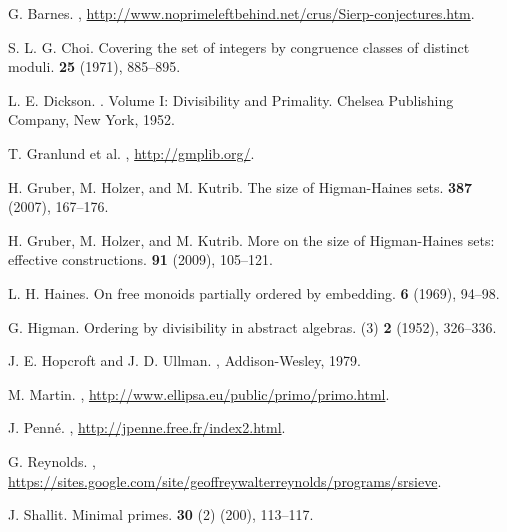\documentclass[12pt]{article}
\theoremstyle{plain}
\theoremstyle{definition}
\theoremstyle{remark}
\newcommand{\0}{\mathtt{0}}
\newcommand{\1}{\mathtt{1}}
\newcommand{\2}{\mathtt{2}}
\newcommand{\3}{\mathtt{3}}
\newcommand{\4}{\mathtt{4}}
\newcommand{\5}{\mathtt{5}}
\newcommand{\6}{\mathtt{6}}
\newcommand{\7}{\mathtt{7}}
\newcommand{\8}{\mathtt{8}}
\newcommand{\9}{\mathtt{9}}
\begin{document}

\begin{thebibliography}{10}

  G. Barnes.
,
\url{http://www.noprimeleftbehind.net/crus/Sierp-conjectures.htm}.

  S. L. G. Choi.
\newblock Covering the set of integers by congruence 
classes of distinct moduli.
 {\bf 25} (1971), 885--895.

L. E. Dickson.
.
\newblock Volume I:  Divisibility and Primality.
\newblock Chelsea Publishing Company, New York, 1952.

  T. Granlund et al.
,
\url{http://gmplib.org/}.

  H. Gruber, M. Holzer, and M. Kutrib.
\newblock The size of Higman-Haines sets.
 {\bf 387} (2007), 167--176.

  H. Gruber, M. Holzer, and M. Kutrib.
\newblock More on the size of Higman-Haines sets:  effective constructions.
 {\bf 91} (2009), 105--121.

  L. H. Haines.
\newblock On free monoids partially ordered by embedding.
 {\bf 6} (1969), 94--98.

  G. Higman.
\newblock Ordering by divisibility in abstract algebras.
 (3) {\bf 2} (1952), 326--336.

  J. E. Hopcroft and J. D. Ullman.
,
Addison-Wesley, 1979.

  M. Martin.
,
\url{http://www.ellipsa.eu/public/primo/primo.html}.

  J. Penn\'e.
,
\url{http://jpenne.free.fr/index2.html}.

  G. Reynolds.
,
\url{https://sites.google.com/site/geoffreywalterreynolds/programs/srsieve}.

  J. Shallit.
\newblock Minimal primes.
 {\bf 30} (2) (200), 113--117.

\end{thebibliography}
\end{document}
